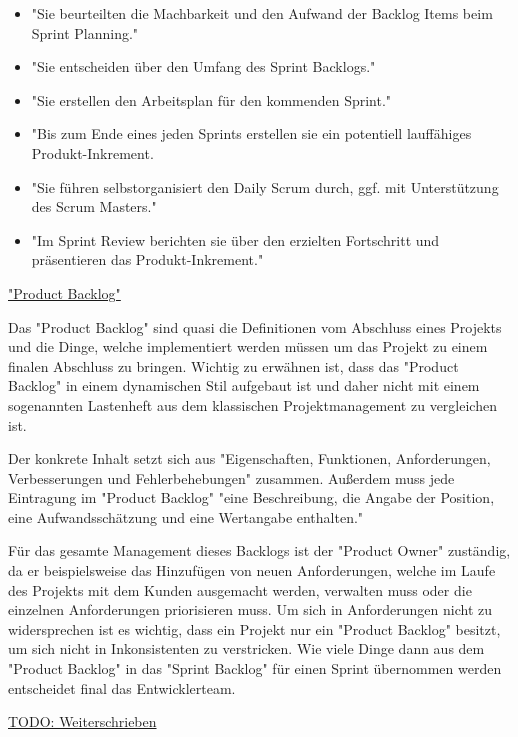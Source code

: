 \begin{itemize}
    \item "Sie beurteilten die Machbarkeit und den Aufwand der Backlog Items beim Sprint Planning." \cite{Entwicklungsteam}
    \item "Sie entscheiden über den Umfang des Sprint Backlogs." \cite{Entwicklungsteam}
    \item "Sie erstellen den Arbeitsplan für den kommenden Sprint." \cite{Entwicklungsteam}
    \item "Bis zum Ende eines jeden Sprints erstellen sie ein potentiell lauffähiges Produkt-Inkrement. \cite{Entwicklungsteam}
    \item "Sie führen selbstorganisiert den Daily Scrum durch, ggf. mit Unterstützung des Scrum Masters." \cite{Entwicklungsteam}
    \item "Im Sprint Review berichten sie über den erzielten Fortschritt und präsentieren das Produkt-Inkrement." \cite{Entwicklungsteam}
\end{itemize}


\underline{"Product Backlog"}

Das "Product Backlog" sind quasi die Definitionen vom Abschluss eines Projekts und die Dinge, welche implementiert werden müssen um das Projekt zu einem finalen Abschluss zu bringen. Wichtig zu erwähnen ist, dass das "Product Backlog" in einem dynamischen Stil aufgebaut ist und daher nicht mit einem sogenannten Lastenheft aus dem klassischen Projektmanagement zu vergleichen ist. \cite{ProductBacklog}

Der konkrete Inhalt setzt sich aus "Eigenschaften, Funktionen, Anforderungen, Verbesserungen und Fehlerbehebungen" \cite{ProductBacklog} zusammen.  Außerdem muss jede Eintragung im "Product Backlog" "eine Beschreibung, die Angabe der Position, eine Aufwandsschätzung und eine Wertangabe enthalten." \cite{ProductBacklog}

Für das gesamte Management dieses Backlogs ist der "Product Owner" zuständig, da er beispielsweise das Hinzufügen von neuen Anforderungen, welche im Laufe des Projekts mit dem Kunden ausgemacht werden, verwalten muss oder die einzelnen Anforderungen priorisieren muss. Um sich in Anforderungen nicht zu widersprechen ist es wichtig, dass ein Projekt nur ein "Product Backlog" besitzt, um sich nicht in Inkonsistenten zu verstricken. Wie viele Dinge dann aus dem "Product Backlog" in das "Sprint Backlog" für einen Sprint übernommen werden entscheidet final das Entwicklerteam. \cite{ProductBacklog}

\underline{TODO: Weiterschrieben}

